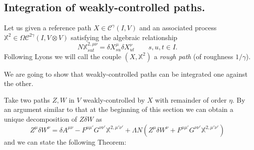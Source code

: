 \documentclass[a4paper,12pt,reqno]{amsproc}
\newcommand{\der}{\delta\!}
\newcommand{\NN}{N}
\newcommand{\CC}{\mathcal{C}}
\newcommand{\OCC}{\Omega \mathcal{C}}
\begin{document}
\subsection{Integration of weakly-controlled paths.} 

Let us given a reference path $X \in \CC^\gamma(I,V)$ and an associated
process $\mathbb{X}^2 \in \OCC^{2\gamma}(I,V\otimes V)$ satisfying the algebraic relationship
\begin{equation}
\label{eq:Hrelation}
\NN \mathbb{X}^{2,\mu\nu}_{sut} = \der X^\mu_{su} \der X^\nu_{ut} \qquad s,u,t \in I.
\end{equation}
Following Lyons we will call the couple $(X,\mathbb{X}^2)$ a \emph{rough
path} (of roughness $1/\gamma$).   

We are going to show that 
 weakly-controlled paths  can be integrated one against the other. 

Take two paths $Z,W$ in $V$ weakly-controlled by $X$ with remainder of order $\eta$.
By an argument similar to that at the beginning of this section we can
obtain a unique decomposition of $Z \der W$ as
\begin{equation*}
  Z^\mu \der W^\nu = \der A^{\mu\nu} - F^{\mu\mu'} G^{\nu\nu'}  \mathbb{X}^{2,\mu'\nu'} + \Lambda \NN(Z^\mu \der W^\nu +
  F^{\mu\mu'} G^{\nu\nu'} \mathbb{X}^{2,\mu'\nu'})
\end{equation*}
and we can state the following Theorem:
\end{document}
